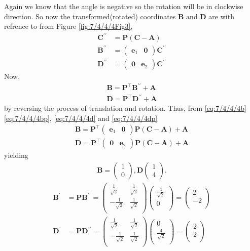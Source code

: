 \documentclass[12pt]{article}
\providecommand{\brak}[1]{\ensuremath{\left(#1\right)}}
\newcommand{\myvec}[1]{\ensuremath{\begin{pmatrix}#1\end{pmatrix}}}
\let\vec\mathbf
\begin{document}
Again we know that the angle is negative so the rotation will be in clockwise direction. So now the transformed(rotated) coordinates $\vec{B} \text{ and } \vec{D}$ are with refrence to 
\fi
from Figure 
\ref{fig:7/4/4/4Fig3},
\begin{align}
	\vec{C^{\prime \prime}} &= \vec{P} (\vec{C}-\vec{A}) 
	\\
\label{eq:7/4/4/4bp}
	\vec{B^{\prime \prime}} &= \myvec{\vec{e}_1 & \vec{0}}\vec{C^{\prime \prime}}
	\\
\label{eq:7/4/4/4dp}
	\vec{D^{\prime \prime}} &= \myvec{ \vec{0} & \vec{e}_2}\vec{C^{\prime \prime}}
\end{align}
Now, 
\begin{align}
\label{eq:7/4/4/4b}
	\vec{B} = \vec{P}^{\top}\vec{B}^{\prime \prime}+\vec{A}
	\\
\label{eq:7/4/4/4d}
	\vec{D} = \vec{P}^{\top}\vec{D}^{\prime \prime}+\vec{A}
\end{align}
by reversing the process of translation and rotation.  Thus, 
from
\eqref{eq:7/4/4/4b}
\eqref{eq:7/4/4/4bp},
\eqref{eq:7/4/4/4d}
and
\eqref{eq:7/4/4/4dp}
\begin{align}
	\vec{B} = \vec{P}^{\top}\myvec{\vec{e}_1 & \vec{0}}\vec{P} (\vec{C}-\vec{A}) +\vec{A}
	\\
	\vec{D} = \vec{P}^{\top}\myvec{\vec{0} & \vec{e}_2  }\vec{P} (\vec{C}-\vec{A}) +\vec{A}
\end{align}
yielding
		\begin{align}
\vec{B}=
\myvec{
1\\
0
},
\vec{D}
\myvec{
1\\
4
}.
		\end{align}
\iffalse
\begin{align}
\vec{B^{\prime}} &= \vec{P}\vec{B^{\prime \prime}} = \myvec{
\frac{1}{\sqrt{2}} & \frac{1}{\sqrt{2}} \\
-\frac{1}{\sqrt{2}} & \frac{1}{\sqrt{2}}\\
}
\myvec{
 \frac{4}{\sqrt{2}}\\
 0\\
} = 
\myvec{
2 \\
-2\\
}\\
\vec{D^{\prime}} &= \vec{P}\vec{D^{\prime \prime}} = \myvec{
\frac{1}{\sqrt{2}} & \frac{1}{\sqrt{2}} \\
-\frac{1}{\sqrt{2}} & \frac{1}{\sqrt{2}}\\
}
\myvec{
 0\\
 \frac{4}{\sqrt{2}}\\
} = 
\myvec{
2 \\
2 \\
}
\end{align}
\end{document}
